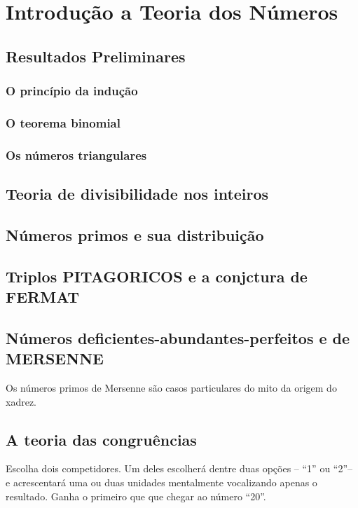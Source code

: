 \chapter{Introdução a Teoria dos Números}
\section{Resultados Preliminares}
\subsection{O princípio da indução}
\subsection{O teorema binomial}
\subsection{Os números triangulares}
\section{Teoria de divisibilidade nos inteiros}
\section{Números primos e sua distribuição}
\section{Triplos PITAGORICOS e a conjctura de FERMAT}
\section{Números deficientes-abundantes-perfeitos e de MERSENNE}

Os números primos de Mersenne são casos particulares do mito da origem do xadrez.


\section{A teoria das congruências}
Escolha dois competidores. Um deles escolherá dentre duas opções -- ``1'' ou ``2''-- e acrescentará uma ou duas unidades mentalmente vocalizando apenas o resultado. Ganha o primeiro que que chegar ao número ``20''.

